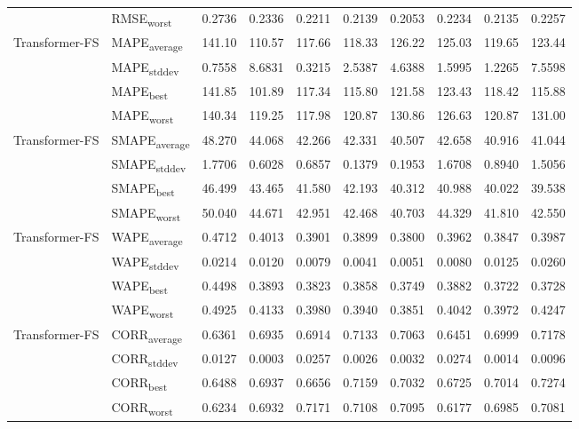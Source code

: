 {\begin{longtable}{l l c c c c c c c c}
 & RMSE\textsubscript{worst} & 0.2736 & 0.2336 & 0.2211 & 0.2139 & 0.2053 & 0.2234 & 0.2135 & 0.2257 \\
\cmidrule(lr){2-10}
\multirow{4}{*}{Transformer-FS} & MAPE\textsubscript{average} & 141.10 & 110.57 & 117.66 & 118.33 & 126.22 & 125.03 & 119.65 & 123.44 \\
 & MAPE\textsubscript{stddev} & 0.7558 & 8.6831 & 0.3215 & 2.5387 & 4.6388 & 1.5995 & 1.2265 & 7.5598 \\
 & MAPE\textsubscript{best} & 141.85 & 101.89 & 117.34 & 115.80 & 121.58 & 123.43 & 118.42 & 115.88 \\
 & MAPE\textsubscript{worst} & 140.34 & 119.25 & 117.98 & 120.87 & 130.86 & 126.63 & 120.87 & 131.00 \\
\cmidrule(lr){2-10}
\multirow{4}{*}{Transformer-FS} & SMAPE\textsubscript{average} & 48.270 & 44.068 & 42.266 & 42.331 & 40.507 & 42.658 & 40.916 & 41.044 \\
 & SMAPE\textsubscript{stddev} & 1.7706 & 0.6028 & 0.6857 & 0.1379 & 0.1953 & 1.6708 & 0.8940 & 1.5056 \\
 & SMAPE\textsubscript{best} & 46.499 & 43.465 & 41.580 & 42.193 & 40.312 & 40.988 & 40.022 & 39.538 \\
 & SMAPE\textsubscript{worst} & 50.040 & 44.671 & 42.951 & 42.468 & 40.703 & 44.329 & 41.810 & 42.550 \\
\cmidrule(lr){2-10}
\multirow{4}{*}{Transformer-FS} & WAPE\textsubscript{average} & 0.4712 & 0.4013 & 0.3901 & 0.3899 & 0.3800 & 0.3962 & 0.3847 & 0.3987 \\
 & WAPE\textsubscript{stddev} & 0.0214 & 0.0120 & 0.0079 & 0.0041 & 0.0051 & 0.0080 & 0.0125 & 0.0260 \\
 & WAPE\textsubscript{best} & 0.4498 & 0.3893 & 0.3823 & 0.3858 & 0.3749 & 0.3882 & 0.3722 & 0.3728 \\
 & WAPE\textsubscript{worst} & 0.4925 & 0.4133 & 0.3980 & 0.3940 & 0.3851 & 0.4042 & 0.3972 & 0.4247 \\
\cmidrule(lr){2-10}
\multirow{4}{*}{Transformer-FS} & CORR\textsubscript{average} & 0.6361 & 0.6935 & 0.6914 & 0.7133 & 0.7063 & 0.6451 & 0.6999 & 0.7178 \\
 & CORR\textsubscript{stddev} & 0.0127 & 0.0003 & 0.0257 & 0.0026 & 0.0032 & 0.0274 & 0.0014 & 0.0096 \\
 & CORR\textsubscript{best} & 0.6488 & 0.6937 & 0.6656 & 0.7159 & 0.7032 & 0.6725 & 0.7014 & 0.7274 \\
 & CORR\textsubscript{worst} & 0.6234 & 0.6932 & 0.7171 & 0.7108 & 0.7095 & 0.6177 & 0.6985 & 0.7081 \\

\end{longtable}}
